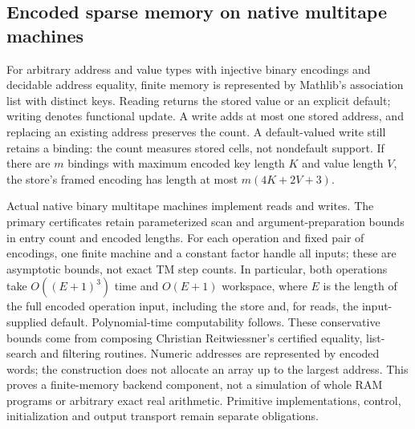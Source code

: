 \begin{result}
\subsection{Encoded sparse memory on native multitape machines}
For arbitrary address and value types with injective binary encodings and decidable address
equality, finite memory is represented by Mathlib's association list with distinct keys.
Reading returns the stored value or an explicit default; writing denotes functional update.
A write adds at most one stored address, and replacing an existing address preserves the count.
A default-valued write still retains a binding: the count measures stored cells, not nondefault
support. If there are $m$ bindings with maximum encoded key length $K$ and value length $V$,
the store's framed encoding has length at most $m(4K+2V+3)$.

Actual native binary multitape machines implement reads and writes. The primary certificates
retain parameterized scan and argument-preparation bounds in entry count and encoded lengths.
For each operation and fixed pair of encodings, one finite machine and a constant factor handle
all inputs;
these are asymptotic bounds, not exact TM step counts. In particular, both operations take
$O((E+1)^3)$ time and $O(E+1)$ workspace, where $E$ is the length of the full encoded operation
input, including the store and, for reads, the input-supplied default. Polynomial-time
computability follows. These conservative bounds come from composing Christian Reitwiessner's
certified equality, list-search and filtering routines. Numeric addresses are represented by
encoded words; the construction does not allocate an array up to the largest address.
This proves a finite-memory backend component, not a simulation of whole RAM programs or
arbitrary exact real arithmetic. Primitive implementations, control, initialization and output
transport remain separate obligations.
\end{result}

